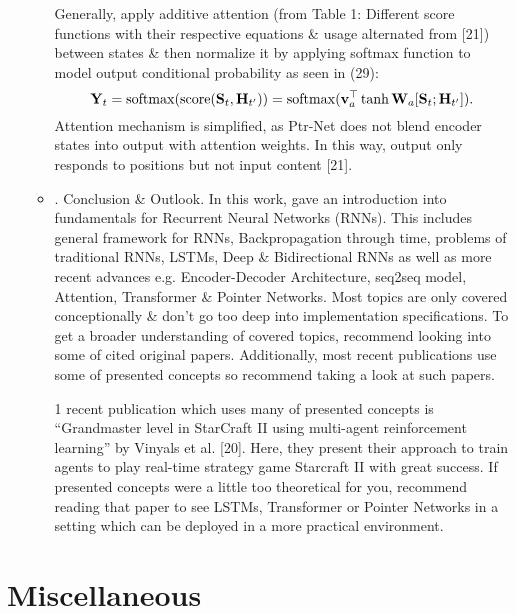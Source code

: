 \documentclass{article}
\begin{document}
\begin{enumerate}
\begin{itemize}
		Generally, apply additive attention (from {\sf Table 1: Different score functions with their respective equations \& usage alternated from [21]}) between states \& then normalize it by applying softmax function to model output conditional probability as seen in (29):
		\begin{equation}
			{\bf Y}_t = {\rm softmax}({\rm score}({\bf S}_t,{\bf H}_{t'})) = {\rm softmax}({\bf v}_a^\top\tanh{\bf W}_a[{\bf S}_t;{\bf H}_{t'}]).
		\end{equation}
		Attention mechanism is simplified, as Ptr-Net does not blend encoder states into output with attention weights. In this way, output only responds to positions but not input content [21].
		\item {. Conclusion \& Outlook.} In this work, gave an introduction into fundamentals for Recurrent Neural Networks (RNNs). This includes general framework for RNNs, Backpropagation through time, problems of traditional RNNs, LSTMs, Deep \& Bidirectional RNNs as well as more recent advances e.g. Encoder-Decoder Architecture, seq2seq model, Attention, Transformer \& Pointer Networks. Most topics are only covered conceptionally \& don't go too deep into implementation specifications. To get a broader understanding of covered topics, recommend looking into some of cited original papers. Additionally, most recent publications use some of presented concepts so recommend taking a look at such papers.
		
		1 recent publication which uses many of presented concepts is ``Grandmaster level in StarCraft II using multi-agent reinforcement learning'' by Vinyals et al. [20]. Here, they present their approach to train agents to play real-time strategy game Starcraft II with great success. If presented concepts were a little too theoretical for you, recommend reading that paper to see LSTMs, Transformer or Pointer Networks in a setting which can be deployed in a more practical environment.
	\end{itemize}
\end{enumerate}


\section{Miscellaneous}
\end{document}
